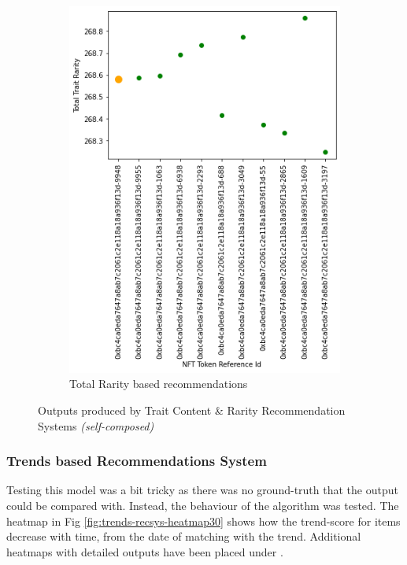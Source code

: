 \begin{figure}[h!]
\begin{subfigure}[b]{0.45\textwidth}
         \includegraphics[width=\textwidth]{images/Testing/trait/Trait rarity representation graph - rarity recommendations.png}
         \caption{Total Rarity based recommendations}
         \label{fig:total-rarity-output}
     \end{subfigure}
     \hfill
        \caption{Outputs produced by Trait Content \& Rarity Recommendation Systems \textit{(self-composed)}}
        \label{fig:trait-recs-outputs}
\end{figure}



\vspace{-5mm}
\subsubsection{Trends based Recommendations System}

Testing this model was a bit tricky as there was no ground-truth that the output could be compared with. Instead, the behaviour of the algorithm was tested.
The heatmap in Fig \ref{fig:trends-recsys-heatmap30} shows how the trend-score for items decrease with time, from the date of matching with the trend. Additional heatmaps with detailed outputs have been placed under \textit{}.

